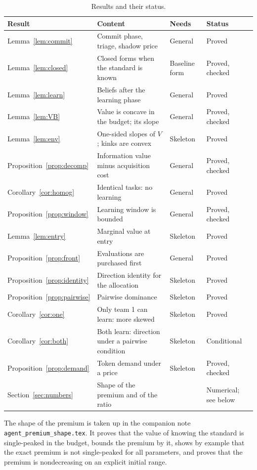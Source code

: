 \documentclass[11pt]{article}
\theoremstyle{definition}
\begin{document}
\begin{table}[htbp]
\centering
\small
\begin{tabular}{@{}llll@{}}
\toprule
Result & Content & Needs & Status \\
\midrule
Lemma~\ref{lem:commit} & Commit phase, triage, shadow price & General & Proved \\
Lemma~\ref{lem:closed} & Closed forms when the standard is known & Baseline form & Proved, checked \\
Lemma~\ref{lem:learn} & Beliefs after the learning phase & General & Proved \\
Lemma~\ref{lem:VB} & Value is concave in the budget; its slope & General & Proved, checked \\
Lemma~\ref{lem:env} & One-sided slopes of $V$; kinks are convex & Skeleton & Proved \\
Proposition~\ref{prop:decomp} & Information value minus acquisition cost & General & Proved, checked \\
Corollary~\ref{cor:homog} & Identical tasks: no learning & General & Proved \\
Proposition~\ref{prop:window} & Learning window is bounded & General & Proved, checked \\
Lemma~\ref{lem:entry} & Marginal value at entry & Skeleton & Proved \\
Proposition~\ref{prop:front} & Evaluations are purchased first & General & Proved \\
Proposition~\ref{prop:identity} & Direction identity for the allocation & Skeleton & Proved \\
Proposition~\ref{prop:pairwise} & Pairwise dominance & Skeleton & Proved \\
Corollary~\ref{cor:one} & Only team 1 can learn: more skewed & Skeleton & Proved \\
Corollary~\ref{cor:both} & Both learn: direction under a pairwise condition & Skeleton & Conditional \\
Proposition~\ref{prop:demand} & Token demand under a price & Skeleton & Proved, checked \\
Section~\ref{sec:numbers} & Shape of the premium and of the ratio & & Numerical; see below \\
\bottomrule
\end{tabular}
\caption{Results and their status.}
\label{tab:status}
\end{table}

The shape of the premium is taken up in the companion note \texttt{agent\_premium\_shape.tex}. It proves that the value of knowing the standard is single-peaked in the budget, bounds the premium by it, shows by example that the exact premium is not single-peaked for all parameters, and proves that the premium is nondecreasing on an explicit initial range.
\end{document}
